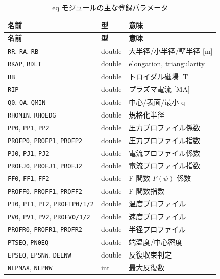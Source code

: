 \documentclass[11pt,a4paper]{report}
\begin{document}
\begin{longtable}{@{}p{3.3cm}p{2.2cm}p{9cm}@{}}
\caption{eq モジュールの主な登録パラメータ}\label{tbl:eq-params}\\
\toprule
\textbf{名前} & \textbf{型} & \textbf{意味} \\ \midrule
\endfirsthead
\toprule
\textbf{名前} & \textbf{型} & \textbf{意味} \\ \midrule
\endhead
\texttt{RR}, \texttt{RA}, \texttt{RB}        & double & 大半径/小半径/壁半径 [m] \\
\texttt{RKAP}, \texttt{RDLT}                 & double & elongation, triangularity \\
\texttt{BB}                                  & double & トロイダル磁場 [T] \\
\texttt{RIP}                                 & double & プラズマ電流 [MA] \\
\texttt{Q0}, \texttt{QA}, \texttt{QMIN}      & double & 中心/表面/最小 q \\
\texttt{RHOMIN}, \texttt{RHOEDG}             & double & 規格化半径 \\
\texttt{PP0}, \texttt{PP1}, \texttt{PP2}     & double & 圧力プロファイル係数 \\
\texttt{PROFP0}, \texttt{PROFP1}, \texttt{PROFP2} & double & 圧力プロファイル指数 \\
\texttt{PJ0}, \texttt{PJ1}, \texttt{PJ2}     & double & 電流プロファイル係数 \\
\texttt{PROFJ0}, \texttt{PROFJ1}, \texttt{PROFJ2} & double & 電流プロファイル指数 \\
\texttt{FF0}, \texttt{FF1}, \texttt{FF2}     & double & F 関数 \(F(\psi)\) 係数 \\
\texttt{PROFF0}, \texttt{PROFF1}, \texttt{PROFF2} & double & F 関数指数 \\
\texttt{PT0}, \texttt{PT1}, \texttt{PT2}, \texttt{PROFTP0/1/2} & double & 温度プロファイル \\
\texttt{PV0}, \texttt{PV1}, \texttt{PV2}, \texttt{PROFV0/1/2}  & double & 速度プロファイル \\
\texttt{PROFR0}, \texttt{PROFR1}, \texttt{PROFR2}              & double & 半径プロファイル \\
\texttt{PTSEQ}, \texttt{PN0EQ}               & double & 端温度/中心密度 \\
\texttt{EPSEQ}, \texttt{EPSNW}, \texttt{DELNW} & double & 反復収束判定 \\
\texttt{NLPMAX}, \texttt{NLPNW}              & int    & 最大反復数 \\

\end{longtable}
\end{document}
